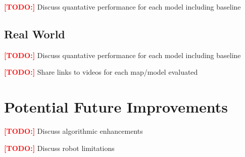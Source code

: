 \documentclass{article}
\newcommand\todo{\textcolor{red}{\textbf{[TODO:] }}}
\begin{document}
\todo Discuss quantative performance for each model including baseline

\subsection{Real World}

\todo Discuss quantative performance for each model including baseline

\todo Share links to videos for each map/model evaluated

\section{Potential Future Improvements}

\todo Discuss algorithmic enhancements

\todo Discuss robot limitations



\end{document}
